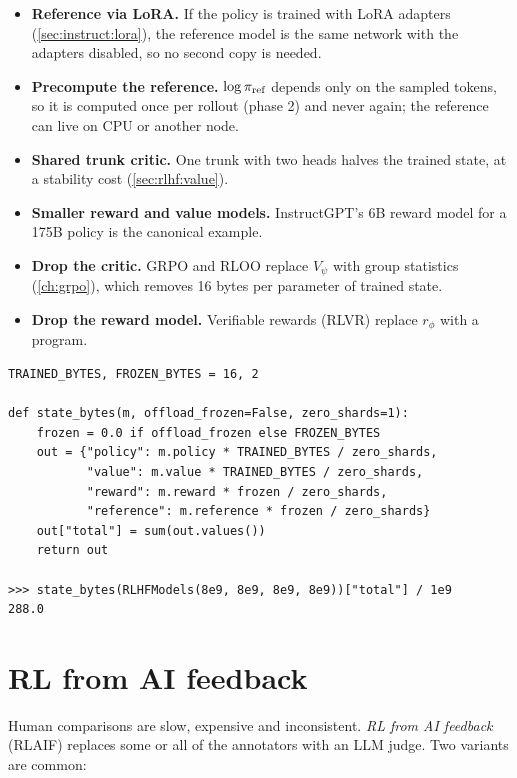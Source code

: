 \begin{systemslens}
\begin{itemize}
  \item \textbf{Reference via LoRA.} If the policy is trained with LoRA adapters (\cref{sec:instruct:lora}),
        the reference model is the same network with the adapters disabled, so no second copy is needed.
  \item \textbf{Precompute the reference.} $\log\pi_{\text{ref}}$ depends only on the sampled tokens, so it is computed
        once per rollout (phase 2) and never again; the reference can live on CPU or another node.
  \item \textbf{Shared trunk critic.} One trunk with two heads halves the trained state, at a
        stability cost (\cref{sec:rlhf:value}).
  \item \textbf{Smaller reward and value models.} InstructGPT's 6B reward model for a 175B policy is the
        canonical example.
  \item \textbf{Drop the critic.} GRPO and RLOO replace $V_\psi$ with group statistics
        (\cref{ch:grpo}), which removes 16 bytes per parameter of trained state.
  \item \textbf{Drop the reward model.} Verifiable rewards (RLVR) replace $r_\phi$ with a program.
\end{itemize}
\end{systemslens}

\begin{lstlisting}[caption={Planning helpers (\ident{llmsys/rlhf/plan.py}).},label={lst:rlhf:plan}]
TRAINED_BYTES, FROZEN_BYTES = 16, 2

def state_bytes(m, offload_frozen=False, zero_shards=1):
    frozen = 0.0 if offload_frozen else FROZEN_BYTES
    out = {"policy": m.policy * TRAINED_BYTES / zero_shards,
           "value": m.value * TRAINED_BYTES / zero_shards,
           "reward": m.reward * frozen / zero_shards,
           "reference": m.reference * frozen / zero_shards}
    out["total"] = sum(out.values())
    return out

>>> state_bytes(RLHFModels(8e9, 8e9, 8e9, 8e9))["total"] / 1e9
288.0
\end{lstlisting}

\section{RL from AI feedback}\label{sec:rlhf:rlaif}

Human comparisons are slow, expensive and inconsistent. \emph{RL from AI feedback} (RLAIF) replaces
some or all of the annotators with an LLM judge. Two variants are common:

